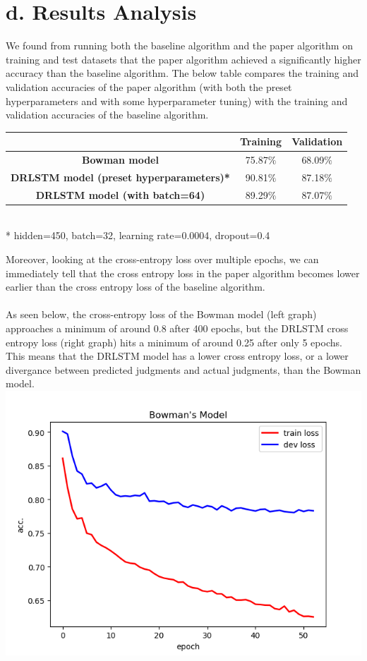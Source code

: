 \documentclass[12pt,letterpaper]{article}
\begin{document}
\section*{d. Results Analysis}
We found from running both the baseline algorithm and the paper algorithm on training and test datasets that the paper algorithm achieved a significantly higher accuracy than the baseline algorithm. The below table compares the training and validation accuracies of the paper algorithm (with both the preset hyperparameters and with some hyperparameter tuning) with the training and validation accuracies of the baseline algorithm. \\
\begin{center}
    \begin{tabular}{| c | c | c |}
        \hline
         & \textbf{Training} & \textbf{Validation}\\ \hline
        \textbf{Bowman model} & 75.87$\%$ & 68.09$\%$
        \\ \hline
        \textbf{DRLSTM model (preset hyperparameters)*} & 90.81$\%$ & 87.18$\%$\\ \hline
        \textbf{DRLSTM model (with batch=64)} & 89.29$\%$ & 87.07$\%$\\ \hline
    \end{tabular} \\
    * hidden=450, batch=32, learning rate=0.0004, dropout=0.4 \\
\end{center}
Moreover, looking at the cross-entropy loss over multiple epochs, we can immediately tell that the cross entropy loss in the paper algorithm becomes lower earlier than the cross entropy loss of the baseline algorithm. \\
\\
As seen below, the cross-entropy loss of the Bowman model (left graph) approaches a minimum of around 0.8 after 400 epochs, but the DRLSTM cross entropy loss (right graph) hits a minimum of around 0.25 after only 5 epochs. This means that the DRLSTM model has a lower cross entropy loss, or a lower divergance between predicted judgments and actual judgments, than the Bowman model.\\
\includegraphics[scale=0.53]{Bowmanxent.PNG}
\end{document}

